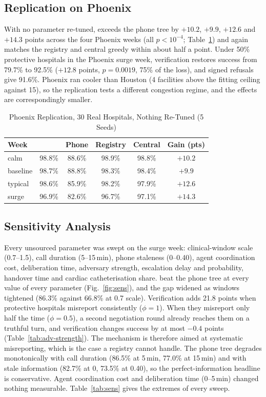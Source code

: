 \subsection{Replication on Phoenix}
With no parameter re-tuned, \mahros{} exceeds the phone tree by $+10.2$, $+9.9$, $+12.6$ and $+14.3$ points across the four Phoenix weeks (all $p<10^{-4}$; Table~\ref{tab:phoenix}) and again matches the registry and central greedy within about half a point. Under 50\% protective hospitals in the Phoenix surge week, verification restores success from 79.7\% to 92.5\% ($+12.8$ points, $p=0.0019$, 75\% of the loss), and signed refusals give 91.6\%. Phoenix ran cooler than Houston (4 facilities above the fitting ceiling against 15), so the replication tests a different congestion regime, and the effects are correspondingly smaller.

\begin{table}[!t]
\centering
\caption{Phoenix Replication, 30 Real Hospitals, Nothing Re-Tuned (5 Seeds)}
\label{tab:phoenix}
\scriptsize
\setlength{\tabcolsep}{3pt}
\begin{tabular}{@{}lccccc@{}}
\toprule
Week & \mahros{} & Phone & Registry & Central & Gain (pts) \\
\midrule
calm     & 98.8\% & 88.6\% & 98.9\% & 98.8\% & $+10.2$ \\
baseline & 98.7\% & 88.8\% & 98.3\% & 98.4\% & $+9.9$ \\
typical  & 98.6\% & 85.9\% & 98.2\% & 97.9\% & $+12.6$ \\
surge    & 96.9\% & 82.6\% & 96.7\% & 97.1\% & $+14.3$ \\
\bottomrule
\end{tabular}
\end{table}

\subsection{Sensitivity Analysis}
\label{sec:res-sens}
Every unsourced parameter was swept on the surge week: clinical-window scale (0.7--1.5), call duration (5--15\,min), phone staleness (0--0.40), agent coordination cost, deliberation time, adversary strength, escalation delay and probability, handover time and cardiac catheterisation share. \mahros{} beat the phone tree at every value of every parameter (Fig.~\ref{fig:sens}), and the gap widened as windows tightened (86.3\% against 66.8\% at 0.7 scale). Verification adds 21.8 points when protective hospitals misreport consistently ($\phi=1$). When they misreport only half the time ($\phi=0.5$), a second negotiation round already reaches them on a truthful turn, and verification changes success by at most $-0.4$ points (Table~\ref{tab:adv-strength}). The mechanism is therefore aimed at systematic misreporting, which is the case a registry cannot handle. The phone tree degrades monotonically with call duration (86.5\% at 5\,min, 77.0\% at 15\,min) and with stale information (82.7\% at 0, 73.5\% at 0.40), so the perfect-information headline is conservative. Agent coordination cost and deliberation time (0--5\,min) changed nothing measurable. Table~\ref{tab:sens} gives the extremes of every sweep.

